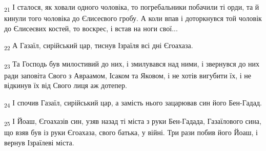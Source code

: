 \begin{tcolorbox}
\textsubscript{21} І сталося, як ховали одного чоловіка, то погребальники побачили ті орди, та й кинули того чоловіка до Єлисеєвого гробу. А коли впав і доторкнувся той чоловік до Єлисеєвих костей, то воскрес, і встав на ноги свої...
\end{tcolorbox}
\begin{tcolorbox}
\textsubscript{22} А Газаїл, сирійський цар, тиснув Ізраїля всі дні Єгоахаза.
\end{tcolorbox}
\begin{tcolorbox}
\textsubscript{23} Та Господь був милостивий до них, і змилувався над ними, і звернувся до них ради заповіта Свого з Авраамом, Ісаком та Яковом, і не хотів вигубити їх, і не відкинув їх від Свого лиця аж дотепер.
\end{tcolorbox}
\begin{tcolorbox}
\textsubscript{24} І спочив Газаїл, сирійський цар, а замість нього зацарював син його Бен-Гадад.
\end{tcolorbox}
\begin{tcolorbox}
\textsubscript{25} І Йоаш, Єгоахазів син, узяв назад ті міста з руки Бен-Гадада, Газаїлового сина, що взяв був із руки Єгоахаза, свого батька, у війні. Три рази побив його Йоаш, і вернув Ізраїлеві міста.
\end{tcolorbox}
